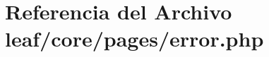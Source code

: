 \hypertarget{error_8php}{\section{Referencia del Archivo leaf/core/pages/error.php}
\label{error_8php}
}
